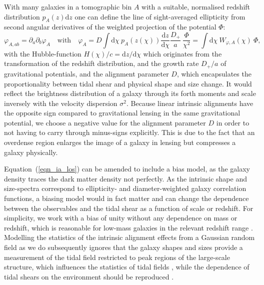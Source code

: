 \documentclass[a4paper,fleqn,usenatbib]{mnras}
\newcommand{\dd}{\mathrm{d}}
\begin{document}
With many galaxies in a tomographic bin $A$ with a suitable, normalised redshift distribution $p_A(z)\dd z$ one can define the line of sight-averaged ellipticity from second angular derivatives of the weighted projection of the potential $\Phi$:
\begin{equation}
\varphi_{A,ab} = \partial_a\partial_b\varphi_A
\quad\mathrm{with}\quad
\varphi_A = D\int\dd\chi\:p_A(z(\chi))\frac{\dd z}{\dd\chi}\frac{D_+}{a}\:\frac{\Phi}{\chi^2} = \int\dd\chi\:W_{\varphi,A}(\chi)\:\Phi,
\label{eqn_ia_los}
\end{equation}
with the Hubble-function $H(\chi)/c = \dd z/\dd\chi$ which originates from the transformation of the redshift distribution, and the growth rate $D_+/a$ of gravitational potentials, and the alignment parameter $D$, which encapsulates the proportionality between tidal shear and physical shape and size change. It would reflect the brightness distribution of a galaxy through its forth moments and scale inversely with the velocity dispersion $\sigma^2$. Because linear intrinsic alignments have the opposite sign compared to gravitational lensing in the same gravitational potential, we choose a negative value for the alignment parameter $D$ in order to not having to carry through minus-signs explicitly. This is due to the fact that an overdense region enlarges the image of a galaxy in lensing but compresses a galaxy physically.

Equation~(\ref{eqn_ia_los}) can be amended to include a bias model, as the galaxy density traces the dark matter density not perfectly. As the intrinsic shape and size-spectra correspond to ellipticity- and diameter-weighted galaxy correlation functions, a biasing model would in fact matter and can change the dependence between the observables and the tidal shear as a function of scale or redshift. For simplicity, we work with a bias of unity without any dependence on mass or redshift, which is reasonable for low-mass galaxies in the relevant redshift range \citep{sheth_large-scale_1999}. Modelling the statistics of the intrinsic alignment effects from a Gaussian random field as we do subsequently ignores that the galaxy shapes and sizes provide a measurement of the tidal field restricted to peak regions of the large-scale structure, which influences the statistics of tidal fields \citep{peacock_statistics_1985, schafer_galactic_2012}, while the dependence of tidal shears on the environment should be reproduced \citep{forero-romero_cosmic_2014, reischke_environmental_2018}.
\end{document}
